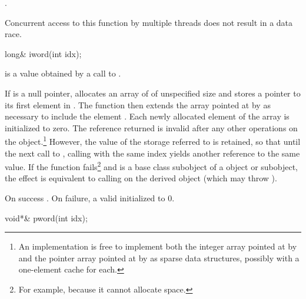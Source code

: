 \begin{itemdescr}
\pnum
\returns
{}
\tcode{++}.

\pnum
\remarks
Concurrent access to this function by multiple threads does not result in a data
race.
\end{itemdescr}

%
\begin{itemdecl}
long& iword(int idx);
\end{itemdecl}

\begin{itemdescr}
\pnum
\expects
{} is a value obtained by a call to .

\pnum
\effects
If  is a null pointer, allocates an array of
of unspecified size and stores a pointer to its first element in
.
The function then extends the array pointed at by
 as necessary to include the element
.
Each newly allocated element of the array is initialized to zero.
The reference returned is invalid after any other operations on the
object.\footnote{An implementation is free to implement both the integer
array pointed at by  and the pointer array pointed at by
 as sparse data structures, possibly with a one-element
cache for each.}
However, the value of the storage referred to is retained, so
that until the next call to
,
calling
with the same index yields another reference to the same value.
If the function fails\footnote{For example, because it cannot allocate space.}
and
is a base class subobject of a
object or subobject, the effect is equivalent to calling
on the derived object (which may throw
).

\pnum
\returns
On success
.
On failure, a valid
initialized to 0.
\end{itemdescr}

%
\begin{itemdecl}
void*& pword(int idx);
\end{itemdecl}

